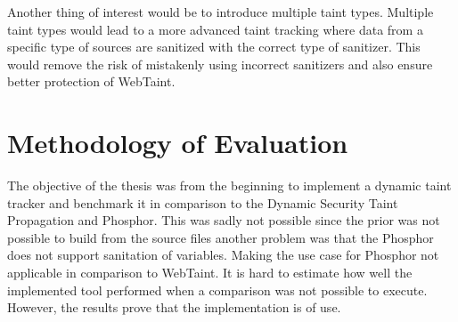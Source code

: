 Another thing of interest would be to introduce multiple taint types. Multiple taint types would lead to a more advanced taint tracking where data from a specific type of sources are sanitized with the correct type of sanitizer. This would remove the risk of mistakenly using incorrect sanitizers and also ensure better protection of WebTaint.



\section{Methodology of Evaluation}
\label{methev}
The objective of the thesis was from the beginning to implement a dynamic taint tracker and benchmark it in comparison to the Dynamic Security Taint Propagation and Phosphor. This was sadly not possible since the prior was not possible to build from the source files another problem was that the Phosphor does not support sanitation of variables. Making the use case for Phosphor not applicable in comparison to WebTaint. It is hard to estimate how well the implemented tool performed when a comparison was not possible to execute. However, the results prove that the implementation is of use.